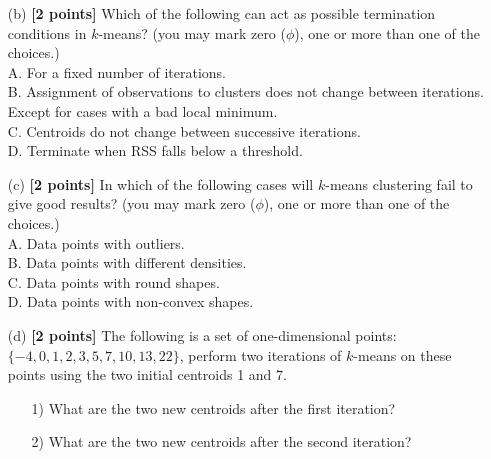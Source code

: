 \documentclass[10pt]{article}
\begin{document}
\begin{enumerate}
\begin{itemize}
		      \item[(b)] \textbf{[2 points]}
					Which of the following can act as possible termination conditions in $k$-means?
					(you may mark zero ($\phi$), one or more than one of the choices.)\\
		            A. For a fixed number of iterations.\\
		            B. Assignment of observations to clusters does not change between iterations. Except for cases with a bad local minimum.\\
		            C. Centroids do not change between successive iterations.\\
		            D. Terminate when RSS falls below a threshold.\\


		      \item[(c)] \textbf{[2 points]}
					In which of the following cases will $k$-means clustering fail to give good results? 
					(you may mark zero ($\phi$), one or more than one of the choices.)\\
		            A. Data points with outliers.\\
		            B. Data points with different densities.\\
		            C. Data points with round shapes.\\
		            D. Data points with non-convex shapes.\\

		      \item[(d)] \textbf{[2 points]}
		            The following is a set of one-dimensional points: $\{-4, 0, 1, 2, 3, 5, 7, 10, 13, 22\}$, perform two iterations of $k$-means on these points using the two initial centroids 1 and 7.
		            \begin{itemize}
			            \item[1)] What are the two new centroids after the first iteration?
			            \item[2)] What are the two new centroids after the second iteration?
		            \end{itemize}
	      \end{itemize}


\end{enumerate}
\end{document}
